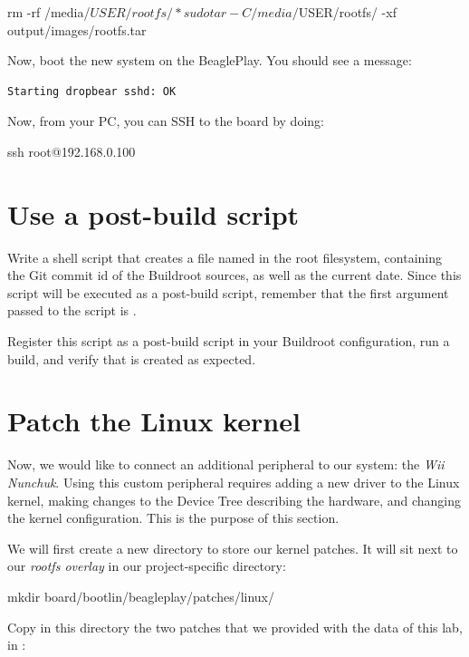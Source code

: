 \begin{bashinput}
rm -rf /media/$USER/rootfs/*
sudo tar -C /media/$USER/rootfs/ -xf output/images/rootfs.tar
\end{bashinput}

Now, boot the new system on the BeaglePlay. You should see a message:

\begin{verbatim}
Starting dropbear sshd: OK
\end{verbatim}

Now, from your PC, you can SSH to the board by doing:

\begin{bashinput}
ssh root@192.168.0.100
\end{bashinput}

\section{Use a post-build script}

Write a shell script that creates a file named  in
the root filesystem, containing the Git commit id of the Buildroot
sources, as well as the current date. Since this script will be
executed as a post-build script, remember that the first argument
passed to the script is .

Register this script as a post-build script in your Buildroot
configuration, run a build, and verify that  is
created as expected.

\section{Patch the Linux kernel}

Now, we would like to connect an additional peripheral to our system:
the {\em Wii Nunchuk}. Using this custom peripheral requires adding a
new driver to the Linux kernel, making changes to the Device Tree
describing the hardware, and changing the kernel configuration. This
is the purpose of this section.

We will first create a new directory to store our kernel patches. It
will sit next to our {\em rootfs overlay} in our project-specific
directory:

\begin{bashinput}
mkdir board/bootlin/beagleplay/patches/linux/
\end{bashinput}

Copy in this directory the two patches that we provided with the data
of this lab, in :

